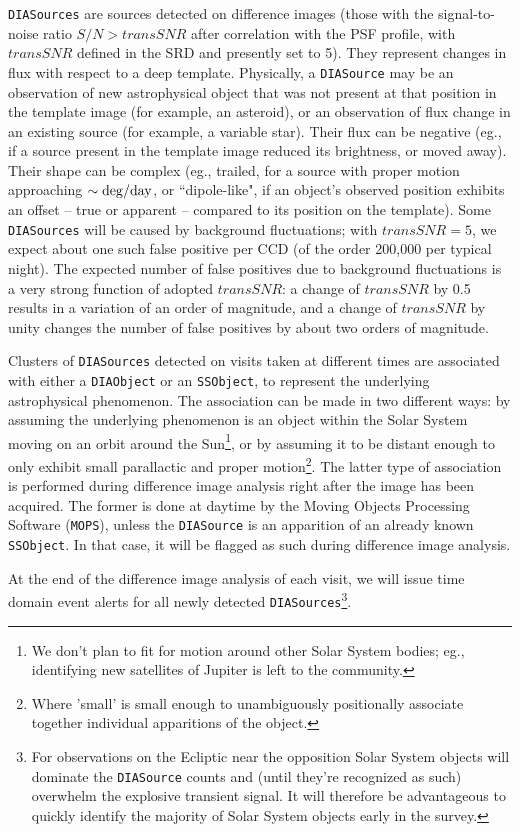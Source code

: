 \documentclass[12pt]{article}
\newcommand{\code}[1]{\texttt{#1}}
\newcommand{\DIASource}{\code{DIASource}\xspace}
\newcommand{\DIASources}{\code{DIASources}\xspace}
\newcommand{\DIAObject}{\code{DIAObject}\xspace}
\newcommand{\SSObject}{\code{SSObject}\xspace}
\newcommand{\transSNR}{5\xspace}
\begin{document}
\DIASources are sources detected on difference images (those with the signal-to-noise ratio $S/N>transSNR$ after correlation with the PSF profile, with $transSNR$ defined in the SRD and presently set to \transSNR). They represent changes in flux with respect to a deep template. Physically, a \DIASource may be an observation of new astrophysical object that was not present at that position in the template image (for example, an asteroid), or an observation of flux change in an existing source (for example, a variable star). Their flux can be negative (eg., if a source present in the template image reduced its brightness, or moved away). Their shape can be complex (eg., trailed, for a source with proper motion approaching $\sim {\rm deg}/{\rm day}$, or ``dipole-like", if an object's observed position exhibits an offset -- true or apparent -- compared to its position on the template).
Some \DIASources will be caused by background fluctuations; with $transSNR = \transSNR$,
we expect about one such false positive per CCD (of the order 200,000 per typical night). The expected number of false
positives due to background fluctuations is a very strong function of adopted $transSNR$: a change of $transSNR$ by 0.5
results in a variation of an order of magnitude, and a change of $transSNR$ by unity changes the number of false
positives by about two orders of magnitude.

Clusters of \DIASources detected on visits taken at different times are associated with either a \DIAObject or an \SSObject, to represent the underlying astrophysical phenomenon. The association can be made in two different ways: by assuming the underlying phenomenon is an object within the Solar System moving on an orbit around the Sun\footnote{We don't plan to fit for motion around other Solar System bodies; eg., identifying new satellites of Jupiter is left to the community.}, or by assuming it to be distant enough to only exhibit small parallactic and proper motion\footnote{Where 'small' is small enough to unambiguously positionally associate together individual apparitions of the object.}. The latter type of association is performed during difference image analysis right after the image has been acquired. The former is done at daytime by the Moving Objects Processing Software (\code{MOPS}), unless the \DIASource is an apparition of an already known \SSObject. In that case, it will be flagged as such during difference image analysis.

At the end of the difference image analysis of each visit, we will issue time domain event alerts for all newly %
detected \DIASources\footnote{For observations on the Ecliptic near the opposition Solar System objects will dominate the \DIASource counts and (until they're recognized as such) overwhelm the explosive transient signal. It will therefore be advantageous to quickly identify the majority of Solar System objects early in the survey.}.
\end{document}
